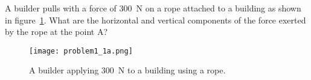 A builder pulls with a force of \SI{300}{\N} on a rope attached to a building as shown in figure~\ref{A1:fig:Q1a}. What are the horizontal and vertical components of the force exerted by the rope at the point A?
\begin{figure}
	\centering
	\texttt{[image: problem1\_1a.png]}
	\caption{A builder applying \SI{300}{\N} to a building using a rope.}
	\label{A1:fig:Q1a}
\end{figure}